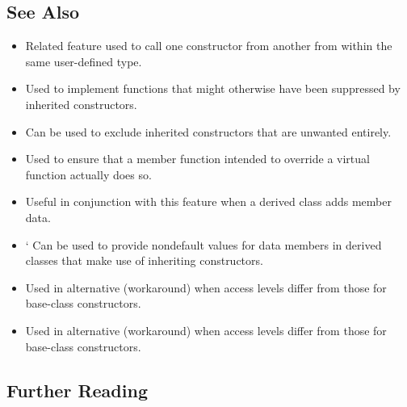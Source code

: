 \subsection[See Also]{See Also}\label{see-also}

\begin{itemize}
\item{%
Related feature used to call one constructor from another from within the same user-defined type.}
\item{%
Used to implement functions that might otherwise have been suppressed by inherited constructors.}
\item{%
Can be used to exclude inherited constructors that are unwanted entirely.}
\item{%
Used to ensure that a member function intended to override a virtual function actually does so.}
\item{%
Useful in conjunction with this feature when a derived class adds member data.}
\item{`%
Can be used to provide nondefault values for data members in derived classes that make use of inheriting constructors.}
\item{%
Used in alternative (workaround) when access levels differ from those for base-class constructors.}
\item{%
Used in alternative (workaround) when access levels differ from those for base-class constructors.}
\end{itemize}

\subsection[Further Reading]{Further Reading}\label{further-reading}

